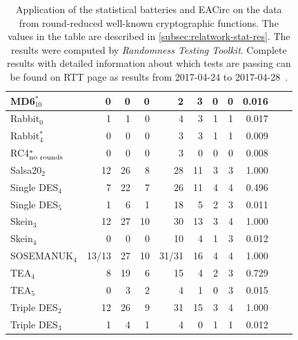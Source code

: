 \documentclass[
    digital,    %
    oneside,    %
    color,
    11pt,
    nocover,
    notable,
    nolof,
    nolot,
]{fithesis3}
\newcommand{\fd}{\cellcolor{red!25}}
\newcommand{\fn}{}
\begin{document}
\begin{table}[H]
\begin{tabular}{@{}l|rrrrrrrrrr@{}}
MD6$_{10}^{\ast}$                &  0    \fn &  0 \fn &  0 \fn   &  2    \fn &  3 \fd & 0 \fn & 0 \fn & 0.016 \fn \\ \hline
Rabbit$_{0}$                     &  1    \fn &  1 \fn &  0 \fn   &  4    \fd &  3 \fd & 1 \fn & 1 \fn & 0.017 \fn \\
Rabbit$_{4}^{\ast}$              &  0    \fn &  0 \fn &  0 \fn   &  3    \fn &  3 \fd & 1 \fn & 1 \fn & 0.009 \fn \\ \hline
RC4$_{\textnormal{no rounds}}^{\ast}$ &  0 \fn &  0 \fn &  0 \fn &  3    \fn &  0 \fn & 0 \fn & 0 \fn & 0.008 \fn \\ \hline
Salsa20$_{2}$                    & 12    \fd & 26 \fd &  8 \fd   & 28    \fd & 11 \fd & 3 \fd & 3 \fd & 1.000 \fd \\ \hline
Single DES$_{4}$                 &  7    \fd & 22 \fd &  7 \fd   & 26    \fd & 11 \fd & 4 \fd & 4 \fd & 0.496 \fd \\
Single DES$_{5}$                 &  1    \fn &  6 \fd &  1 \fn   & 18    \fd &  5 \fd & 2 \fd & 3 \fd & 0.011 \fn \\ \hline
Skein$_{3}$                      & 12    \fd & 27 \fd & 10 \fd   & 30    \fd & 13 \fd & 3 \fd & 4 \fd & 1.000 \fd \\
Skein$_{4}$                      &  0    \fn &  0 \fn &  0 \fn   & 10    \fd &  4 \fd & 1 \fn & 3 \fd & 0.012 \fn \\ \hline
SOSEMANUK$_{4}$                  & 13/13 \fd & 27 \fd & 10 \fd   & 31/31 \fd & 16 \fd & 4 \fd & 4 \fd & 1.000 \fd \\ \hline
TEA$_{4}$                        &  8    \fd & 19 \fd &  6 \fd   & 15    \fd &  4 \fd & 2 \fd & 3 \fd & 0.729 \fd \\
TEA$_{5}$                        &  0    \fn &  3 \fn &  2 \fn   &  4    \fd &  1 \fn & 0 \fn & 3 \fd & 0.015 \fn \\ \hline
Triple DES$_{2}$                 & 12    \fd & 26 \fd &  9 \fd   & 31    \fd & 15 \fd & 3 \fd & 4 \fd & 1.000 \fd \\
Triple DES$_{3}$                 &  1    \fn &  4 \fd &  1 \fn   &  4    \fd &  0 \fn & 1 \fn & 1 \fn & 0.012 \fn \\

\end{tabular}

\caption{Application of the statistical batteries and EACirc on the data from round-reduced well-known cryptographic functions. 
The values in the table are described in \cref{subsec:relatwork-stat-res}.
The results were computed by \textit{Randomness Testing Toolkit}. Complete results with detailed information about which tests are passing can be found on RTT page as results from 2017-04-24 to 2017-04-28~\cite{rttusable}.}
\label{table:res-batteries}
\end{table}
\end{document}
